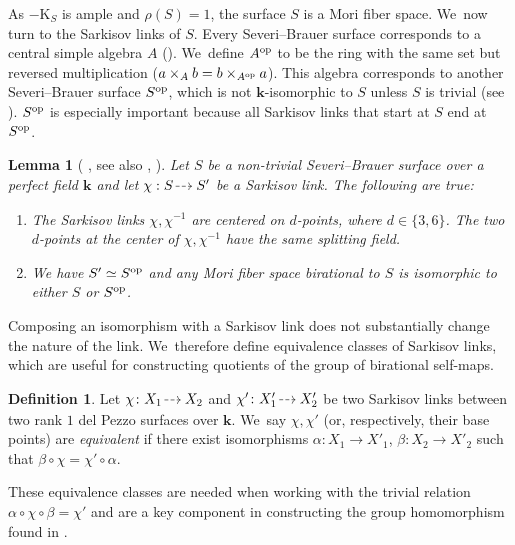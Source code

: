 \documentclass[JEP,XML,SOM,Unicode,NoFloatCountersInSection, NoEqCountersInSection,published]{cedram}
\newcommand{\dradpl}{{\hspace*{-2mm}\begin{tikzcd}[ampersand replacement=\&,column sep = scriptsize]\mbox{}\ar[r,dashed]\&\mbox{}\end{tikzcd}\hspace*{-2mm}}}
\newcommand{\dratst}{{\hspace*{-2.5mm}\begin{tikzcd}[ampersand replacement=\&,column sep = small]\mbox{}\ar[r,dashed]\&\mbox{}\end{tikzcd}\hspace*{-2mm}}}
\let\drascst\dratst
\newcommand{\dra}{\mathchoice{\dradpl}{\dratst}{\drascst}{\drascst}}
\newcommand{\op}{\textup{op}}
\newtheorem{lemma}[theorem]{Lemma}
\theoremstyle{definition}
\newtheorem{definition}[theorem]{Definition}
\newcommand{\kk}{{\boldsymbol{k}}}
\begin{document}
As $-\mathrm{K}_S$ is ample and $\rho(S) = 1$, the surface $S$ is a Mori fiber space. We~now turn to the Sarkisov links of $S$. Every Severi--Brauer surface corresponds to a central simple algebra $A$ ({\cite[\S 6]{jahnel}}). We~define $A^{\op}$ to be the ring with the same set but reversed multiplication ($a \times_A b = b \times_{A^{\op}} a$). This algebra corresponds to another Severi--Brauer surface $S^{\op}$, which is not $\kk$-isomorphic to $S$ unless $S$ is trivial (see \cite[3.2.5/3.2.6]{BSY}). $S^{\op}$ is especially important because all Sarkisov links that start at $S$ end at $S^{\op}$.

\begin{lemma}[ {\cite[3.2.3, 3.2.7]{BSY}}, see also \cite{cm:9040}, \cite{zbMATH07206468}] \label{Links36}
Let $S$ be a non-trivial Severi--Brauer surface over a perfect field $\kk$ and let $\chi: S \dra S'$ be a Sarkisov link. The following are true:
\begin{enumerate}
\item The Sarkisov links $\chi, \chi^{-1}$ are centered on $d$-points, where $d \in \{3,6\}$. The two $d$-points at the center of $\chi,\chi^{-1}$ have the same splitting field.
\item We have $S' \simeq S^{\op}$ and any Mori fiber space birational to $S$ is isomorphic to either $S$ or $S^{\op}$.
\end{enumerate}

\end{lemma}
Composing an isomorphism with a Sarkisov link does not substantially change the nature of the link. We~therefore define equivalence classes of Sarkisov links, which are useful for constructing quotients of the group of birational self-maps.

\begin{definition} \label{def: equivLinks}
Let $\chi \colon X_1 \dra X_2$ and $\chi'\colon X'_1 \dra X'_2$ be two Sarkisov links between two rank $1$ del Pezzo surfaces over $\kk$. We~say $\chi, \chi'$ (or, respectively, their base points) are \emph{equivalent} if there exist isomorphisms $\alpha \colon X_1 \to X'_1$, $\beta \colon X_2 \to X'_2$ such that $\beta \circ \chi = \chi' \circ \alpha$.
\end{definition}

These equivalence classes are needed when working with the trivial relation \hbox{$\alpha \circ \chi \circ \beta = \chi'$} and are a key component in constructing the group homomorphism found in \cite{BSY}.
\end{document}
